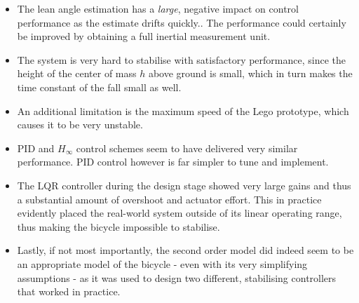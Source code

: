 \begin{itemize}
\item{The lean angle estimation has a \textit{large}, negative impact on control performance as the estimate drifts quickly.. The performance could certainly be improved by obtaining a full inertial measurement unit.}
\item{The system is very hard to stabilise with satisfactory performance, since the height of the center of mass $h$ above ground is small, which in turn makes the time constant of the fall small as well.}
\item{An additional limitation is the maximum speed of the Lego prototype, which causes it to be very unstable.}
\item{PID and $H_{\infty}$ control schemes seem to have delivered very similar performance. PID control however is far simpler to tune and implement.}
\item{The LQR controller during the design stage showed very large gains and thus a substantial amount of overshoot and actuator effort. This in practice evidently placed the real-world system outside of its linear operating range, thus making the bicycle impossible to stabilise.}
\item{Lastly, if not most importantly, the second order model did indeed seem to be an appropriate model of the bicycle - even with its very simplifying assumptions - as it was used to design two different, stabilising controllers that worked in practice.}
\end{itemize}